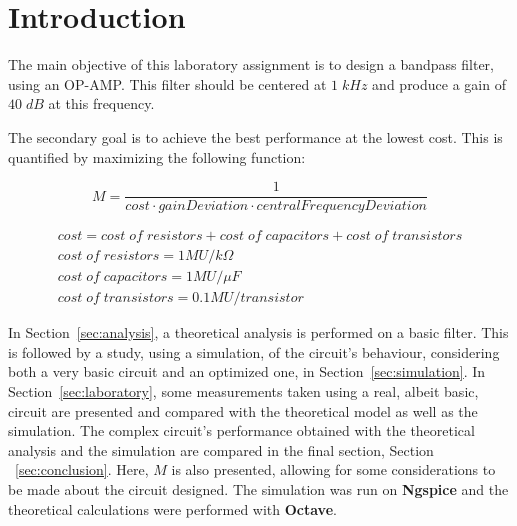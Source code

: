 \newpage

\section{Introduction}
\label{sec:introduction}

The main objective of this laboratory assignment is to design a bandpass filter, using an OP-AMP. This filter should be centered at $1\;kHz$ and produce a gain of $40\;dB$ at this frequency.

The secondary goal is to achieve the best performance at the lowest cost. This is quantified by maximizing the following function:

\begin{equation}
  M = \frac{1}{cost \cdot gainDeviation \cdot centralFrequencyDeviation}
\end{equation}

\begin{gather*}
  cost = cost\;of\;resistors + cost\;of\;capacitors + cost\;of\;transistors \\
  cost\;of\;resistors = 1 MU/k\Omega \\
  cost\;of\;capacitors = 1 MU/\mu F \\
  cost\;of\;transistors = 0.1 MU/transistor
\end{gather*}

In Section~\ref{sec:analysis}, a theoretical analysis is performed on a basic filter. This is followed by a study, using a simulation, of the circuit's behaviour, considering both a very basic circuit and an optimized one, in Section~\ref{sec:simulation}. In Section~\ref{sec:laboratory}, some measurements taken using a real, albeit basic, circuit are presented and compared with the theoretical model as well as the simulation. The complex circuit's performance obtained with the theoretical analysis and the simulation are compared in the final section, Section ~\ref{sec:conclusion}. Here, $M$ is also presented, allowing for some considerations to be made about the circuit designed. The simulation was run on {\bf Ngspice} and the theoretical calculations were performed with {\bf Octave}.

